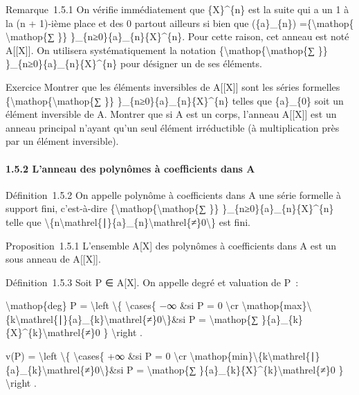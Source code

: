 \documentclass[]{article}
\begin{document}
Remarque~1.5.1 On vérifie immédiatement que \{X\}\^{}\{n\} est la suite
qui a un 1 à la (n + 1)-ième place et des 0 partout ailleurs si bien que
(\{a\}\_\{n\}) =\{\textbackslash{}mathop\{ \textbackslash{}mathop\{∑
\}\} \}\_\{n≥0\}\{a\}\_\{n\}\{X\}\^{}\{n\}. Pour cette raison, cet
anneau est noté A{[}{[}X{]}{]}. On utilisera systématiquement la
notation \{\textbackslash{}mathop\{\textbackslash{}mathop\{∑ \}\}
\}\_\{n≥0\}\{a\}\_\{n\}\{X\}\^{}\{n\} pour désigner un de ses éléments.

Exercice Montrer que les éléments inversibles de A{[}{[}X{]}{]} sont les
séries formelles \{\textbackslash{}mathop\{\textbackslash{}mathop\{∑
\}\} \}\_\{n≥0\}\{a\}\_\{n\}\{X\}\^{}\{n\} telles que \{a\}\_\{0\} soit
un élément inversible de A. Montrer que si A est un corps, l'anneau
A{[}{[}X{]}{]} est un anneau principal n'ayant qu'un seul élément
irréductible (à multiplication près par un élément inversible).

\paragraph{1.5.2 L'anneau des polynômes à coefficients dans A}

Définition~1.5.2 On appelle polynôme à coefficients dans A une série
formelle à support fini, c'est-à-dire
\{\textbackslash{}mathop\{\textbackslash{}mathop\{∑ \}\}
\}\_\{n≥0\}\{a\}\_\{n\}\{X\}\^{}\{n\} telle que
\textbackslash{}\{n\textbackslash{}mathrel\{∣\}\{a\}\_\{n\}\textbackslash{}mathrel\{≠\}0\textbackslash{}\}
est fini.

Proposition~1.5.1 L'ensemble A{[}X{]} des polynômes à coefficients dans
A est un sous anneau de A{[}{[}X{]}{]}.

Définition~1.5.3 Soit P ∈ A{[}X{]}. On appelle degré et valuation de P~:

\textbackslash{}mathop\{deg\} P = \textbackslash{}left
\textbackslash{}\{ \textbackslash{}cases\{ −∞ \&si P = 0
\textbackslash{}cr
\textbackslash{}mathop\{max\}\textbackslash{}\{k\textbackslash{}mathrel\{∣\}\{a\}\_\{k\}\textbackslash{}mathrel\{≠\}0\textbackslash{}\}\&si
P = \textbackslash{}mathop\{∑
\}\{a\}\_\{k\}\{X\}\^{}\{k\}\textbackslash{}mathrel\{≠\}0 \}
\textbackslash{}right .

v(P) = \textbackslash{}left \textbackslash{}\{ \textbackslash{}cases\{
+∞ \&si P = 0 \textbackslash{}cr
\textbackslash{}mathop\{min\}\textbackslash{}\{k\textbackslash{}mathrel\{∣\}\{a\}\_\{k\}\textbackslash{}mathrel\{≠\}0\textbackslash{}\}\&si
P = \textbackslash{}mathop\{∑
\}\{a\}\_\{k\}\{X\}\^{}\{k\}\textbackslash{}mathrel\{≠\}0 \}
\textbackslash{}right .
\end{document}
